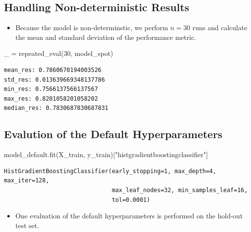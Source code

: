 \documentclass[
  letterpaper,
  DIV=11,
  numbers=noendperiod]{scrreprt}
\newenvironment{Shaded}{\begin{snugshade}}{\end{snugshade}}
\newcommand{\DecValTok}[1]{\textcolor[rgb]{0.68,0.00,0.00}{#1}}
\newcommand{\NormalTok}[1]{\textcolor[rgb]{0.00,0.23,0.31}{#1}}
\newcommand{\OperatorTok}[1]{\textcolor[rgb]{0.37,0.37,0.37}{#1}}
\newcommand{\StringTok}[1]{\textcolor[rgb]{0.13,0.47,0.30}{#1}}
\providecommand{\tightlist}{%
  \setlength{\itemsep}{0pt}\setlength{\parskip}{0pt}}\usepackage{longtable,booktabs,array}
\begin{document}
\hypertarget{handling-non-deterministic-results-1}{%
\subsection{Handling Non-deterministic
Results}\label{handling-non-deterministic-results-1}}

\begin{itemize}
\tightlist
\item
  Because the model is non-determinstic, we perform \(n=30\) runs and
  calculate the mean and standard deviation of the performance metric.
\end{itemize}

\begin{Shaded}
\begin{Highlighting}[]
\NormalTok{\_ }\OperatorTok{=}\NormalTok{ repeated\_eval(}\DecValTok{30}\NormalTok{, model\_spot)}
\end{Highlighting}
\end{Shaded}

\begin{verbatim}
mean_res: 0.7860670194003526
std_res: 0.013639669348137786
min_res: 0.7566137566137567
max_res: 0.8201058201058202
median_res: 0.7830687830687831
\end{verbatim}

\hypertarget{evalution-of-the-default-hyperparameters-1}{%
\subsection{Evalution of the Default
Hyperparameters}\label{evalution-of-the-default-hyperparameters-1}}

\begin{Shaded}
\begin{Highlighting}[]
\NormalTok{model\_default.fit(X\_train, y\_train)[}\StringTok{"histgradientboostingclassifier"}\NormalTok{]}
\end{Highlighting}
\end{Shaded}

\begin{verbatim}
HistGradientBoostingClassifier(early_stopping=1, max_depth=4, max_iter=128,
                               max_leaf_nodes=32, min_samples_leaf=16,
                               tol=0.0001)
\end{verbatim}

\begin{itemize}
\tightlist
\item
  One evaluation of the default hyperparameters is performed on the
  hold-out test set.
\end{itemize}
\end{document}
